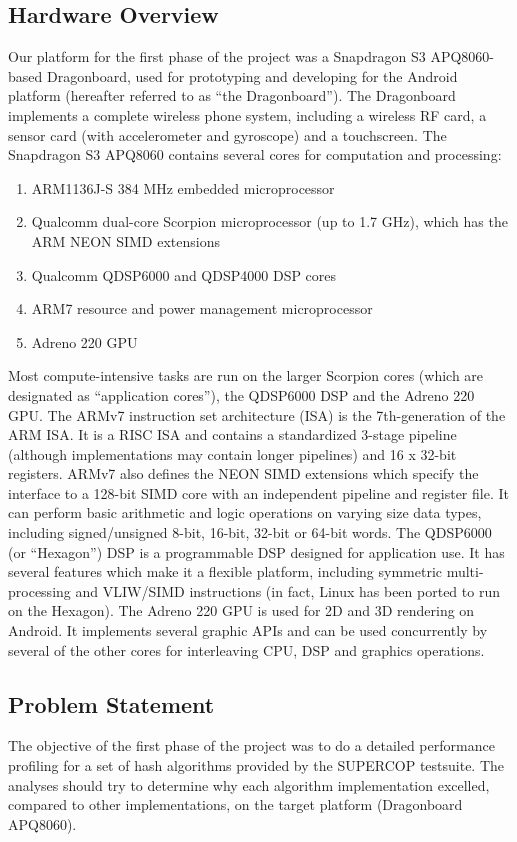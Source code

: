 \documentclass[10pt,a4paper]{article}
\begin{document}
\subsection{Hardware Overview}
Our platform for the first phase of the project was a Snapdragon S3 APQ8060-based Dragonboard, used for prototyping and developing for the Android platform (hereafter referred to as ``the Dragonboard'').  The Dragonboard implements a complete wireless phone system, including a wireless RF card, a sensor card (with accelerometer and gyroscope) and a touchscreen.  The Snapdragon S3 APQ8060 contains several cores for computation and processing:

\begin{enumerate}
	\item ARM1136J-S 384 MHz embedded microprocessor
	\item Qualcomm dual-core Scorpion microprocessor (up to 1.7 GHz), which has the ARM NEON SIMD extensions
	\item Qualcomm QDSP6000 and QDSP4000 DSP cores
	\item ARM7 resource and power management microprocessor
	\item Adreno 220 GPU
\end{enumerate}

Most compute-intensive tasks are run on the larger Scorpion cores (which are designated as ``application cores''), the QDSP6000 DSP and the Adreno 220 GPU.  The ARMv7 instruction set architecture (ISA) is the 7th-generation of the ARM ISA.  It is a RISC ISA and contains a standardized 3-stage pipeline (although implementations may contain longer pipelines) and 16 x 32-bit registers.  ARMv7 also defines the NEON SIMD extensions which specify the interface to a 128-bit SIMD core with an independent pipeline and register file.  It can perform basic arithmetic and logic operations on varying size data types, including signed/unsigned 8-bit, 16-bit, 32-bit or 64-bit words.  The QDSP6000 (or ``Hexagon'') DSP is a programmable DSP designed for application use.  It has several features which make it a flexible platform, including symmetric multi-processing and VLIW/SIMD instructions (in fact, Linux has been ported to run on the Hexagon).  The Adreno 220 GPU is used for 2D and 3D rendering on Android.  It implements several graphic APIs and can be used concurrently by several of the other cores for interleaving CPU, DSP and graphics operations.

\subsection{Problem Statement}
The objective of the first phase of the project was to do a detailed performance profiling for a set of hash algorithms provided by the SUPERCOP testsuite. The analyses should try to determine why each algorithm implementation excelled, compared to other implementations,  on the target platform (Dragonboard APQ8060).   
\end{document}
